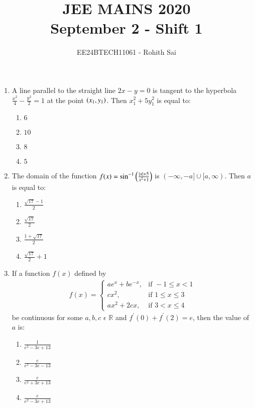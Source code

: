 \documentclass[journal]{IEEEtran}
\begin{document}

\vspace{3cm}

\title{JEE MAINS 2020\\September 2 - Shift 1}
\author{EE24BTECH11061 - Rohith Sai}
\maketitle

\renewcommand{\thefigure}{\theenumi}
\renewcommand{\thetable}{\theenumi}
\begin{enumerate}
\item A line parallel to the straight line $2x-y = 0$ is tangent to the hyperbola $\frac{x^2}{4}-\frac{y^2}{2} = 1$ at the point $\left(x_1, y_1\right)$. Then $x_1^2 + 5y_1^2$ is equal to:
\begin{multicols}{2}
    \begin{enumerate}
        \item $6$
        \item $10$
        \item $8$
        \item $5$
    \end{enumerate}
\end{multicols}

\item The domain of the function $f(x) = \sin^{-1}\left(\frac{\left\vert x\right\vert+5}{x^2+1}\right)$ is $(-\infty,-a] \cup [a,\infty) $. Then $a$ is equal to:
\begin{multicols}{2}
    \begin{enumerate}
        \item $\frac{\sqrt{17}-1}{2}$
        \item $\frac{\sqrt{17}}{2}$
        \item $\frac{1+\sqrt{17}}{2}$
        \item $\frac{\sqrt{17}}{2} + 1$
        \end{enumerate}
\end{multicols}

\item If a function $f(x)$ defined by
\begin{align}
    f(x) = \begin{cases}
ae^x + be^{-x}, & \text{if } -1\leq x < 1\\
cx^2, & \text{if } 1\leq x \leq 3\\
ax^2 + 2cx, & \text{if } 3 < x \leq 4
\end{cases}
\end{align}
be continuous for some $a,b,c$ $\epsilon$ $\mathbb{R}$ and $f^{\prime}(0) + f^{\prime}(2) = e$, then the value of $a$ is:
\begin{multicols}{2}
    \begin{enumerate}
        \item $\frac{1}{e^2-3e+13}$
        \item $\frac{e}{e^2-3e-13}$
        \item $\frac{e}{e^2+3e+13}$
        \item $\frac{e}{e^2-3e+13}$
    \end{enumerate}
\end{multicols}


\end{enumerate}
\end{document}
